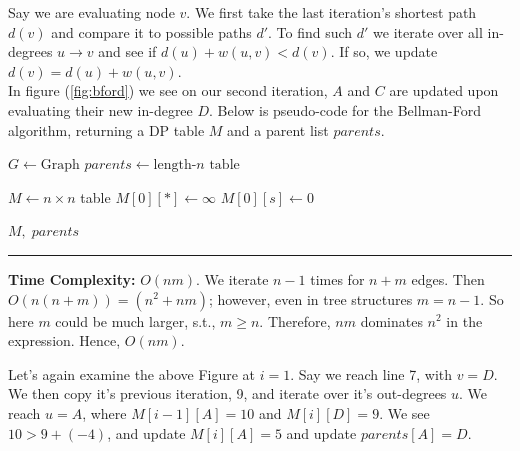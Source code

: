 \noindent
Say we are evaluating node $v$. We first take the last iteration's shortest path $d(v)$ and compare it to possible paths $d'$. To 
find such $d'$ we iterate over all in-degrees $u\to v$ and see if $d(u)+w(u,v)<d(v)$. If so, we update $d(v)=d(u)+w(u,v)$.\\

\noindent
In figure (\ref{fig:bford}) we see on our second iteration, $A$ and $C$ are updated upon evaluating their new in-degree $D$.
Below is pseudo-code for the Bellman-Ford algorithm, returning a DP table $M$ and a parent list $parents$.
\begin{Func}

    \vspace{-.5em}
    \begin{algorithm}[H]
        $G \gets \text{Graph}$ 
        $parents \gets \text{length-}n \text{ table}$ 
        
        $M \gets n \times n$ table 
        $M[0][*] \gets \infty$ 
        $M[0][s] \gets 0$ 
        
        
        \Return $M, \; parents$\;
    \end{algorithm}
    
    \noindent
    \rule{\textwidth}{0.4pt}
    \textbf{Time Complexity:} $O(nm)$. We iterate $n-1$ times for $n+m$ edges. Then $O(n(n+m))=(n^2 + nm)$; however,
    even in tree structures $m=n-1$. So here $m$ could be much larger, s.t., $m\geq n$. Therefore, $nm$ dominates $n^2$
    in the expression. Hence, $O(nm)$.
\end{Func}
\noindent
Let's again examine the above Figure at $i=1$. Say we reach line 7, with $v=D$. We then copy it's previous iteration,
9, and iterate over it's out-degrees $u$. We reach $u=A$, where $M[i-1][A]=10$ and $M[i][D]=9$. We see $10>9+(-4)$,
and update $M[i][A]=5$ and update $parents[A]=D$.


